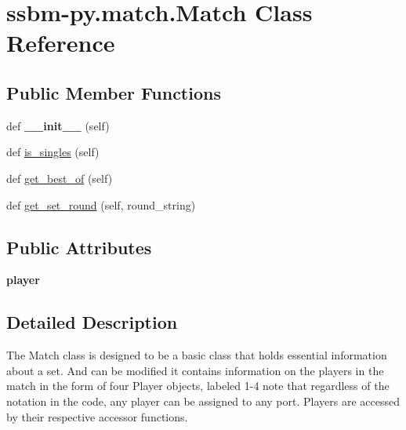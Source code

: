 \hypertarget{classssbm-py_1_1match_1_1_match}{}\section{ssbm-\/py.match.\+Match Class Reference}
\label{classssbm-py_1_1match_1_1_match}
\subsection*{Public Member Functions}
\begin{DoxyCompactItemize}
\item 
\mbox{\label{classssbm-py_1_1match_1_1_match_af9976cfb563fc57b35f8fdde1485daa7}} 
def {\bfseries \+\_\+\+\_\+init\+\_\+\+\_\+} (self)
\item 
def \hyperlink{classssbm-py_1_1match_1_1_match_a437a1c291dc23588076add106dcb787b}{is\+\_\+singles} (self)
\item 
def \hyperlink{classssbm-py_1_1match_1_1_match_abc1ed5b3ce5ad859ce6f0efe4c53b0c4}{get\+\_\+best\+\_\+of} (self)
\item 
def \hyperlink{classssbm-py_1_1match_1_1_match_acfdd80d2f04e2d98050447d905ab368d}{get\+\_\+set\+\_\+round} (self, round\+\_\+string)
\end{DoxyCompactItemize}
\subsection*{Public Attributes}
\begin{DoxyCompactItemize}
\item 
\mbox{\label{classssbm-py_1_1match_1_1_match_af56a57528654fa5c0811b7d94dfe6e98}} 
{\bfseries player}
\end{DoxyCompactItemize}


\subsection{Detailed Description}
\begin{DoxyVerb}The Match class is designed to be a basic class that
holds essential information about a set. And can be modified
it contains information on the players in the match
in the form of four Player objects, labeled 1-4
note that regardless of the notation in the code,
any player can be assigned to any port. Players are accessed
by their respective accessor functions.
\end{DoxyVerb}
 

